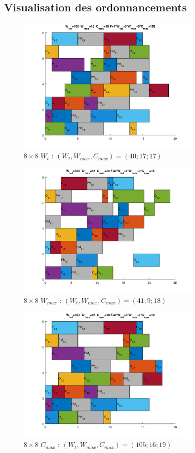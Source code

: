\documentclass[10pt,a4paper]{scrartcl}
\begin{document}
\subsection{Visualisation des ordonnancements}
\label{annexe:visual_ordo}
\begin{figure}
  \centering
  \includegraphics[width=0.8\textwidth]{img/results8x8_Wtot.png}
  \caption{$8 \times 8$ $W_{t}$ : $(W_t, W_{max}, C_{max}) = (40; 17; 17)$}
\end{figure}
\begin{figure}
  \centering
  \includegraphics[width=0.8\textwidth]{img/results8x8_Wmax.png}
  \caption{$8 \times 8$ $W_{max}$ : $(W_t, W_{max}, C_{max}) = (41; 9; 18)$}
\end{figure}
\begin{figure}
  \centering
  \includegraphics[width=0.8\textwidth]{img/results8x8_Cmax.png}
  \caption{$8 \times 8$ $C_{max}$ : $(W_t, W_{max}, C_{max}) = (105; 16; 19)$}
\end{figure}
\end{document}

